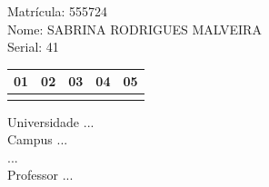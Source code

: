 \documentclass[10pt,a4paper,twocolumn]{report}
\begin{document}
Matrícula: 555724\\ Nome: SABRINA RODRIGUES MALVEIRA \\ Serial: 41\\
\begin{tabular}{|l|l|l|l|l|}\hline
01  &02  &03  &04  &05 \\ \hline 
 & & & & \\ \hline 
\end{tabular}
 \cleardoublepage 

\begin{flushleft}
Universidade ...\\
Campus ...\\
...\\
Professor ...\\
\end{flushleft}
\end{document}
